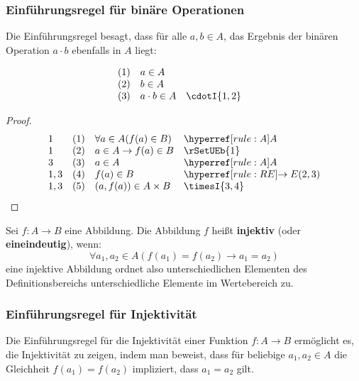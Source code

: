 \documentclass[main.tex]{subfiles}
\begin{document}
\subsubsection*{Einführungsregel für binäre Operationen}
\label{rule:cdotI}

Die Einführungsregel besagt, dass für alle \( a, b \in A \), das Ergebnis der binären Operation \( a \cdot b \) ebenfalls in \( A \) liegt:

\[
\begin{array}{llll}
    (1) & a \in A & & \\
    (2) & b \in A & & \\
    (3) & a \cdot b \in A & \cdotI{1,2} & 
\end{array}
\]


\begin{theorem}
\end{theorem}
\begin{proof}
	\[
	\begin{array}{llll}
		1   &  (1) & \forall a\in A(f(a)\in B) & \rA \\
            1   &  (2) & a\in A\rightarrow f(a)\in B & \rSetUEb{1} \\
            3   &  (3) & a\in A & \rA \\
            1,3 &  (4) & f(a)\in B & \rRE{2,3} \\
            1,3 &  (5) & (a,f(a))\in A\times B & \timesI{3,4} \\
	\end{array}
	\]
\end{proof}

\begin{definition}[Injektivität]
    Sei \( f: A \to B \) eine Abbildung. Die Abbildung \( f \) heißt \textbf{injektiv} (oder \textbf{eineindeutig}), wenn:
    \[
    \forall a_1,a_2\in A(f(a_1) = f(a_2) \rightarrow a_1 = a_2)
    \]
    eine injektive Abbildung ordnet also unterschiedlichen Elementen des Definitionsbereichs unterschiedliche Elemente im Wertebereich zu.
\end{definition}

\subsubsection*{Einführungsregel für Injektivität}
\label{rule:InjI}

Die Einführungsregel für die Injektivität einer Funktion \( f: A \to B \) ermöglicht es, die Injektivität zu zeigen, indem man beweist, dass für beliebige \( a_1, a_2 \in A \) die Gleichheit \( f(a_1) = f(a_2) \) impliziert, dass \( a_1 = a_2 \) gilt.
\end{document}
